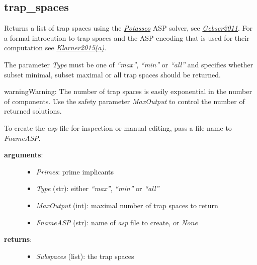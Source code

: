 \documentclass[letterpaper,10pt,english]{sphinxmanual}
\begin{document}
\subsection{trap\_spaces}
\label{TrapSpaces:id2}\label{TrapSpaces:trap-spaces}

\begin{fulllineitems}
\label{TrapSpaces:PyBoolNet.TrapSpaces.trap_spaces}
Returns a list of trap spaces using the {\hyperref[Installation:installation-potassco]{\emph{Potassco}}} ASP solver, see {\hyperref[Bibliography:gebser2011]{\emph{Gebser2011}}}.
For a formal introcution to trap spaces and the ASP encoding that is used for their computation see {\hyperref[Bibliography:klarner2015trap]{\emph{Klarner2015(a)}}}.

The parameter \emph{Type} must be one of \emph{``max''}, \emph{``min''} or \emph{``all''} and
specifies whether subset minimal, subset maximal or all trap spaces should be returned.

\begin{notice}{warning}{Warning:}
The number of trap spaces is easily exponential in the number of components.
Use the safety parameter \emph{MaxOutput} to control the number of returned solutions.
\end{notice}

To create the \emph{asp} file for inspection or manual editing, pass a file name to \emph{FnameASP}.
\begin{description}
\item[{\textbf{arguments}:}] \leavevmode\begin{itemize}
\item {} 
\emph{Primes}: prime implicants

\item {} 
\emph{Type} (str): either \emph{``max''}, \emph{``min''} or \emph{``all''}

\item {} 
\emph{MaxOutput} (int): maximal number of trap spaces to return

\item {} 
\emph{FnameASP} (str): name of \emph{asp} file to create, or \emph{None}

\end{itemize}

\item[{\textbf{returns}:}] \leavevmode\begin{itemize}
\item {} 
\emph{Subspaces} (list): the trap spaces


\end{itemize}
\end{description}
\end{fulllineitems}
\end{document}
